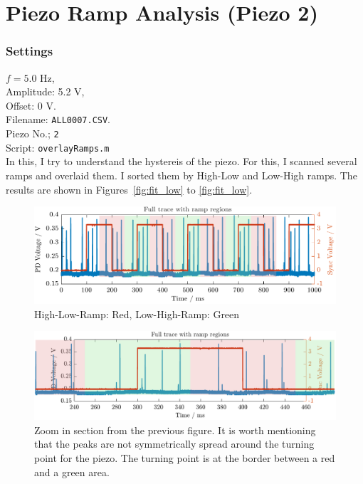 \section{Piezo Ramp Analysis (Piezo 2)}
\subsubsection*{Settings}

$f = 5.0$ Hz,  \\
Amplitude: 5.2 V,  \\
Offset: 0 V.  \\
Filename: \texttt{ALL0007.CSV}.   \\
Piezo No.; \texttt{2}  \\
Script: \texttt{overlayRamps.m} \\


In this, I try to understand the hystereis of the piezo. For this, I scanned several ramps and overlaid them.
I sorted them by High-Low and Low-High ramps. The results are shown in Figures~\ref{fig:fit_low} to \ref{fig:fit_low}.


\begin{figure}[H]
    \centering
    \includegraphics[width=\textwidth]{ManyRamp/ManyRamps.pdf}
    \caption{High-Low-Ramp: Red, Low-High-Ramp: Green}
\end{figure}

\begin{figure}[H]
    \centering
    \includegraphics[width=\textwidth]{ManyRamp/Zoomed_Ramp.pdf}
    \caption{Zoom in section from the previous figure. It is worth mentioning that the peaks are not symmetrically spread around the turning point for the piezo. The turning point is at the border between a red and a green area.}
\end{figure}

